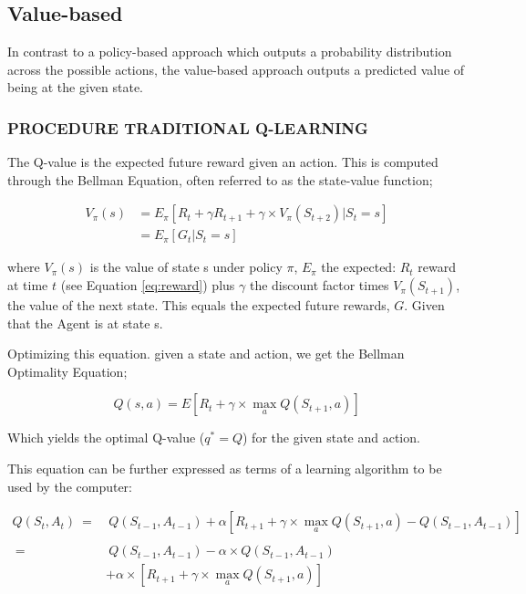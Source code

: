 \documentclass{article}
\renewenvironment{leftbar}[1][\hsize]{
    \def\FrameCommand{{\color{barcolor}\vrule width 0.5pt \hspace{10pt}}}
    \MakeFramed{\hsize#1 \advance\hsize-\width \FrameRestore}
}{\endMakeFramed}
\begin{document}
\subsection*{Value-based}
\begin{leftbar}
    In contrast to a policy-based approach which outputs a probability distribution across the possible actions, the value-based approach outputs a predicted value of being at the given state. \cite{HF-value}

    \subsubsection*{PROCEDURE \hfill TRADITIONAL Q-LEARNING}

    The Q-value is the expected future reward given an action. This is computed through the Bellman Equation, often referred to as the state-value function;

    \begin{equation}
        \begin{split}
            V_\pi (s) &= E_\pi [R_t + \gamma R_{t+1} + \gamma \times V_\pi (S_{t+2}) | S_t = s] \\
            &= E_\pi [G_t | S_t = s]
        \end{split}
    \end{equation}

    where $V_\pi (s)$ is the value of state s under policy $\pi$, $E_\pi$ the expected: $R_t$ reward at time $t$ (see Equation \eqref{eq:reward}) plus $\gamma$ the discount factor times $V_\pi (S_{t+1})$, the value of the next state. This equals the expected future rewards, $G$. Given that the Agent is at state s. \cite{HF-bellman} \cite{Q-traditional}

    Optimizing this equation. given a state and action, we get the Bellman Optimality Equation;

    \begin{equation}
        Q(s, a) = E[R_t + \gamma \times \max_a Q(S_{t+1}, a)]
    \end{equation}

    Which yields the optimal Q-value ($q^* = Q$) for the given state and action. \cite{Q-intro}

    This equation can be further expressed as terms of a learning algorithm to be used by the computer:

    \begin{equation}
        \begin{split}
            Q(S_t, A_t)\ =&\ Q(S_{t-1}, A_{t-1}) + \alpha \left[ R_{t+1} + \gamma \times \max_a Q(S_{t+1}, a) - Q(S_{t-1}, A_{t-1}) \right] \\ \\
            \ =&\ Q(S_{t-1}, A_{t-1}) - \alpha \times Q(S_{t-1}, A_{t-1}) \\
            \ & + \alpha \times \left[ R_{t+1} + \gamma \times \max_a Q(S_{t+1}, a) \right]
        \end{split} \label{eq:q-star-traditional}
    \end{equation}


\end{leftbar}
\end{document}
